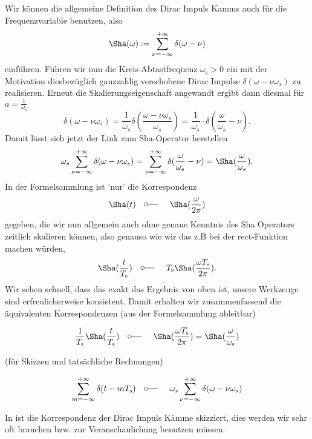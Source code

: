 Wir können die allgemeine Definition des Dirac Impuls Kamms
auch für die Frequenzvariable benutzen, also
\begin{equation}
{\Sha}(\omega) := \sum_{\nu=-\infty}^{+\infty} \delta(\omega-\nu)
\end{equation}
einführen.
Führen wir nun die Kreis-Abtastfrequenz $\omega_\mathrm{s}>0$ ein mit der Motivation
diesbezüglich ganzzahlig verschobene Dirac Impulse $\delta(\omega - \nu \omega_s)$
zu realisieren.
Erneut die Skalierungseigenschaft angewandt ergibt dann diesmal für
$a=\frac{1}{\omega_\mathrm{s}}$
\begin{equation}
\delta(\omega - \nu \omega_s) =
\frac{1}{\omega_s}\delta(\frac{\omega - \nu \omega_s}{\omega_s}) =
\frac{1}{\omega_s} \cdot \delta(\frac{\omega}{\omega_s}-\nu).
\end{equation}
%
Damit lässt sich jetzt der Link zum Sha-Operator herstellen
\begin{equation}
\omega_s \sum_{\nu=-\infty}^{+\infty} \delta(\omega-\nu \omega_s) =
\sum_{\nu=-\infty}^{+\infty} \delta(\frac{\omega}{\omega_s}-\nu) =
{\Sha}(\frac{\omega}{\omega_s}).
\end{equation}
%
In der Formelsammlung ist 'nur' die Korrespondenz
\begin{align}
  \Sha(t) \quad\fourier\quad \Sha(\frac{\omega}{2\pi})
\end{align}
gegeben, die wir nun allgemein auch ohne genaue Kenntnis des Sha Operators zeitlich
skalieren können, also genauso wie wir das z.B bei der rect-Funktion machen würden,
\begin{align}
  \Sha(\frac{t}{T_\mathrm{s}}) \quad\fourier\quad
  T_\mathrm{s} \Sha(\frac{\omega T_\mathrm{s}}{2\pi}).
\end{align}
Wir sehen schnell, dass das exakt das Ergebnis von oben ist, unsere Werkzeuge
sind erfreulicherweise konsistent.
%
Damit erhalten wir zusammenfassend die äquivalenten Korrespondenzen
(aus der Formelsammlung ableitbar)
\begin{mdframed}
\begin{equation}
\frac{1}{T_\mathrm{s}} {\Sha}(\frac{t}{T_\mathrm{s}}) \quad\fourier\quad
{\Sha}(\frac{\omega T_\mathrm{s}}{2 \pi}) =
\Sha(\frac{\omega}{\omega_\mathrm{s}})
\end{equation}
\end{mdframed}
(für Skizzen und tatsächliche Rechnungen)
\begin{mdframed}
\begin{equation}
\sum_{m=-\infty}^{+\infty} \delta(t-m T_\mathrm{s}) \quad\fourier\quad
\omega_s \sum_{\nu=-\infty}^{+\infty} \delta(\omega-\nu \omega_s)
\end{equation}
\end{mdframed}
%
In  ist die Korrespondenz der Dirac Impuls Kämme
skizziert, dies werden wir sehr oft brauchen bzw. zur Veranschaulichung benutzen
müssen.

